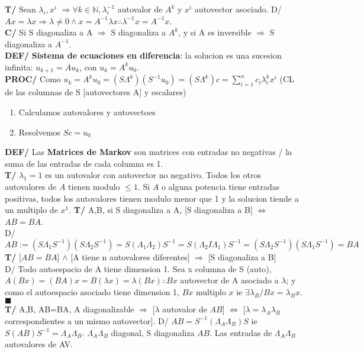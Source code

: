 \documentclass[10pt,a4paper]{article}
\newcommand*{\QEDA}{\null\nobreak\hfill\ensuremath{\blacksquare}}
\begin{document}
\textbf{T/} Sean $\lambda_i, x^i$ $\Rightarrow \forall k \in \mathbb{N}, \lambda_i^{-1}$ autovalor de $A^k$ y $x^i$ autovector asociado. D/ $Ax=\lambda x \Rightarrow \lambda \not = 0 \land x=A^{-1}\lambda x \therefore \lambda^{-1}x = A^{-1}x $.\\
\textbf{C/} Si S diagonaliza a A $\Rightarrow$ S diagonaliza a $A^k$, y si A es inversible $\Rightarrow$ S diagonaliza a $A^{-1}$.\\
\textbf{DEF/} \textbf{Sistema de ecuaciones en diferencia}: la solucion es una sucesion infinita: $u_{k+1} = Au_k$, con $u_k = A^ku_0$.\\
\textbf{PROC/} Como $u_k = A^ku_0 = (S\Lambda^k)(S^{-1}u_0) = (S\Lambda^k)c = \sum_{i=1}^nc_i\lambda_i^kx^i$ (CL de las columnas de S [autovectores A] y escalares)
\begin{enumerate}
\item Calculamos autovalores y autovectoes
\item Resolvemos $Sc = u_0$
\end{enumerate}
\textbf{DEF/} Las \textbf{Matrices de Markov} son matrices con entradas no negativas / la suma de las entradas de cada columna es 1.\\
\textbf{T/} $\lambda_1 = 1$ es un autovalor con autovector no negativo. Todos los otros autovalores de $A$ tienen modulo $\leq 1$. Si $A$ o alguna potencia tiene entradas positivas, todos los autovalores tienen modulo menor que 1 y la solucion tiende a un multiplo de $x^1$.
\textbf{T/} A,B, si S diagonaliza a A, [S diagonaliza a B] $\iff$ $AB=BA$.\\
D/ $AB:=(S\Lambda_1S^{-1})(S\Lambda_2S^{-1}) = S(\Lambda_1\Lambda_2)S^{-1} = S(\Lambda_2I\Lambda_1)S^{-1} = (S\Lambda_2 S^{-1})(S\Lambda_1S^{-1}) = BA$ \\
\textbf{T/} [$AB=BA$] $\land$ [A tiene n autovalores diferentes] $\Rightarrow$ [S diagonaliza a B]\\
D/ Todo autoespacio de A tiene dimension 1. Sea x columna de S (auto), $A(Bx) = (BA)x = B(\lambda x) = \lambda (Bx) \therefore Bx$ autovector de A asociado a $\lambda$; y como el autoespacio asociado tiene dimension 1, $Bx$ multiplo $x$ ie $\exists \lambda_B / Bx = \lambda_Bx$. \QEDA\\
\textbf{T/} A,B, AB=BA, A diagonalizable $\Rightarrow$ [$\lambda$ autovalor de $AB$] $\iff$ [$\lambda = \lambda_A\lambda_B$ correspondientes a un mismo autovector].
D/ $AB = S^{-1}(\Lambda_A\Lambda_B)S$ ie $S(AB)S^{-1} = \Lambda_A\Lambda_B$. $\Lambda_A\Lambda_B$ diagonal, S diagonaliza $AB$. Las entradas de $\Lambda_A\Lambda_B$ autovalores de AV.\\
\end{document}
